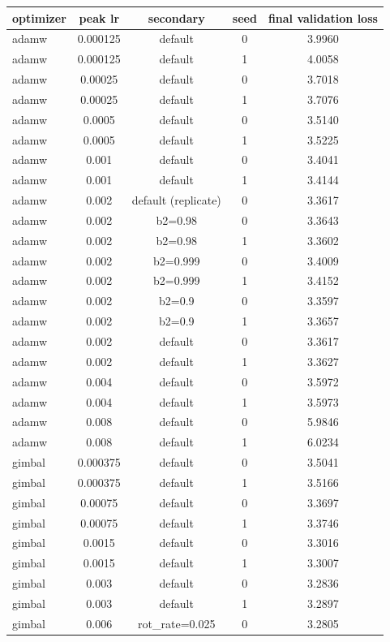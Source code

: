 \begin{tabular}{lcccc}
\toprule
optimizer & peak lr & secondary & seed & final validation loss \\
\midrule
adamw & 0.000125 & default & 0 & 3.9960 \\
adamw & 0.000125 & default & 1 & 4.0058 \\
adamw & 0.00025 & default & 0 & 3.7018 \\
adamw & 0.00025 & default & 1 & 3.7076 \\
adamw & 0.0005 & default & 0 & 3.5140 \\
adamw & 0.0005 & default & 1 & 3.5225 \\
adamw & 0.001 & default & 0 & 3.4041 \\
adamw & 0.001 & default & 1 & 3.4144 \\
adamw & 0.002 & default (replicate) & 0 & 3.3617 \\
adamw & 0.002 & b2=0.98 & 0 & 3.3643 \\
adamw & 0.002 & b2=0.98 & 1 & 3.3602 \\
adamw & 0.002 & b2=0.999 & 0 & 3.4009 \\
adamw & 0.002 & b2=0.999 & 1 & 3.4152 \\
adamw & 0.002 & b2=0.9 & 0 & 3.3597 \\
adamw & 0.002 & b2=0.9 & 1 & 3.3657 \\
adamw & 0.002 & default & 0 & 3.3617 \\
adamw & 0.002 & default & 1 & 3.3627 \\
adamw & 0.004 & default & 0 & 3.5972 \\
adamw & 0.004 & default & 1 & 3.5973 \\
adamw & 0.008 & default & 0 & 5.9846 \\
adamw & 0.008 & default & 1 & 6.0234 \\
gimbal & 0.000375 & default & 0 & 3.5041 \\
gimbal & 0.000375 & default & 1 & 3.5166 \\
gimbal & 0.00075 & default & 0 & 3.3697 \\
gimbal & 0.00075 & default & 1 & 3.3746 \\
gimbal & 0.0015 & default & 0 & 3.3016 \\
gimbal & 0.0015 & default & 1 & 3.3007 \\
gimbal & 0.003 & default & 0 & 3.2836 \\
gimbal & 0.003 & default & 1 & 3.2897 \\
gimbal & 0.006 & rot\_rate=0.025 & 0 & 3.2805 \\

\end{tabular}
